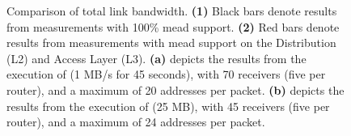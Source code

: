 \begin{figure}
    \begin{center}
        
    \end{center}
    \caption[UC2 File Transfer: Comparison of total link bandwidth]{
        \nucii{} Comparison of total link bandwidth.
        \textbf{(1)} Black bars denote results from measurements with 100\%
            \gls{mead} support.
        \textbf{(2)} Red bars denote results from measurements with \gls{mead}
            support on the Distribution (L2) and Access Layer (L3).
        \textbf{(a)} depicts the results from the execution of \nuci{} (1 MB/s
            for 45 seconds), with 70 receivers (five per router),
            and a maximum of 20 addresses per packet.
        \textbf{(b)} depicts the results from the execution of \nucii{} (25
            MB), with 45 receivers (five per router), and a maximum of 24
            addresses per packet.
    }
    \label{fig:link_bw_l2l3_100}
\end{figure}



